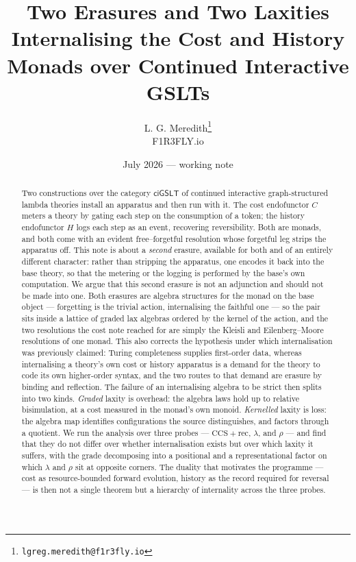 \documentclass[11pt,a4paper]{article}
\title{Two Erasures and Two Laxities\\[4pt]
\large Internalising the Cost and History Monads over Continued Interactive GSLTs}
\author{L. G. Meredith\thanks{\texttt{lgreg.meredith@f1r3fly.io}}\\ F1R3FLY.io}
\date{July 2026 --- working note}
\theoremstyle{definition}
\theoremstyle{plain}
\theoremstyle{remark}
\newcommand{\ciG}{\mathsf{ciGSLT}}
\newcommand{\rhoc}{\rho}
\newcommand{\CCSrec}{\mathrm{CCS}{+}\mathrm{rec}}
\begin{document}
\maketitle

\begin{abstract}
Two constructions over the category $\ciG$ of continued interactive graph-structured lambda
theories install an apparatus and then run with it. The cost endofunctor $C$ meters a theory by
gating each step on the consumption of a token; the history endofunctor $H$ logs each step as an
event, recovering reversibility. Both are monads, and both come with an evident free--forgetful
resolution whose forgetful leg strips the apparatus off. This note is about a \emph{second}
erasure, available for both and of an entirely different character: rather than stripping the
apparatus, one encodes it back into the base theory, so that the metering or the logging is
performed by the base's own computation. We argue that this second erasure is not an adjunction
and should not be made into one. Both erasures are algebra structures for the monad on the base
object --- forgetting is the trivial action, internalising the faithful one --- so the pair sits
inside a lattice of graded lax algebras ordered by the kernel of the action, and the two
resolutions the cost note reached for are simply the Kleisli and Eilenberg--Moore resolutions of
one monad. This also corrects the hypothesis under which internalisation was previously claimed:
Turing completeness supplies first-order data, whereas internalising a theory's own cost or
history apparatus is a demand for the theory to code its own higher-order syntax, and the two
routes to that demand are erasure by binding and reflection. The failure of an internalising
algebra to be strict then splits into two kinds. \emph{Graded} laxity is overhead: the algebra
laws hold up to relative bisimulation, at a cost measured in the monad's own monoid. \emph{Kernelled}
laxity is loss: the algebra map identifies configurations the source distinguishes, and factors
through a quotient. We run the analysis over three probes --- $\CCSrec$, $\lambda$, and $\rhoc$ ---
and find that they do not differ over whether internalisation exists but over which laxity it
suffers, with the grade decomposing into a positional and a representational factor on which
$\lambda$ and $\rhoc$ sit at opposite corners. The duality that motivates the programme ---
cost as resource-bounded forward evolution, history as the record required for reversal ---
is then not a single theorem but a hierarchy of internality across the three probes.
\end{abstract}
\end{document}
